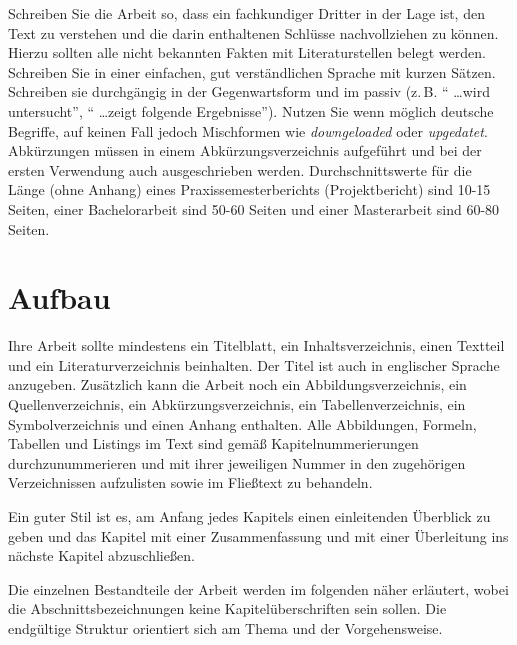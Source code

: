 \documentclass[conference,final,a4paper]{IEEEtran}
\begin{document}
Schreiben Sie die Arbeit so, dass ein fachkundiger Dritter in der Lage ist, den Text zu verstehen und die darin enthaltenen Schlüsse nachvollziehen zu können. Hierzu sollten alle nicht bekannten Fakten mit Literaturstellen belegt werden. Schreiben Sie in einer einfachen, gut verständlichen Sprache mit kurzen Sätzen. Schreiben sie durchgängig in der Gegenwartsform und im passiv (z.\,B. "` \dots wird untersucht"', "` \dots zeigt folgende Ergebnisse"'). Nutzen Sie wenn möglich deutsche Begriffe, auf keinen Fall jedoch Mischformen wie \emph{downgeloaded} oder \emph{upgedatet}. Abkürzungen müssen in einem Abkürzungsverzeichnis aufgeführt und bei der ersten Verwendung auch ausgeschrieben werden. Durchschnittswerte für die Länge (ohne Anhang) eines Praxissemesterberichts (Projektbericht) sind 10-15 Seiten, einer Bachelorarbeit sind 50-60 Seiten und einer Masterarbeit sind 60-80 Seiten.

\section{Aufbau}

Ihre Arbeit sollte mindestens ein Titelblatt, ein Inhaltsverzeichnis, einen Textteil und ein Literaturverzeichnis beinhalten. Der Titel ist auch in englischer Sprache anzugeben. Zusätzlich kann die Arbeit noch ein Abbildungsverzeichnis, ein Quellenverzeichnis, ein Abkürzungsverzeichnis, ein Tabellenverzeichnis, ein Symbolverzeichnis und einen Anhang enthalten. Alle Abbildungen, Formeln, Tabellen und Listings im Text sind gemäß Kapitelnummerierungen durchzunummerieren und mit ihrer jeweiligen Nummer in den zugehörigen Verzeichnissen aufzulisten sowie im Fließtext zu behandeln.

Ein guter Stil ist es, am Anfang jedes Kapitels einen einleitenden Überblick zu geben und das Kapitel mit einer Zusammenfassung und mit einer Überleitung ins nächste Kapitel abzuschließen. 

Die einzelnen Bestandteile der Arbeit werden im folgenden näher erläutert, wobei die Abschnittsbezeichnungen keine Kapitelüberschriften sein sollen. Die endgültige Struktur orientiert sich am Thema und der Vorgehensweise.
\end{document}
